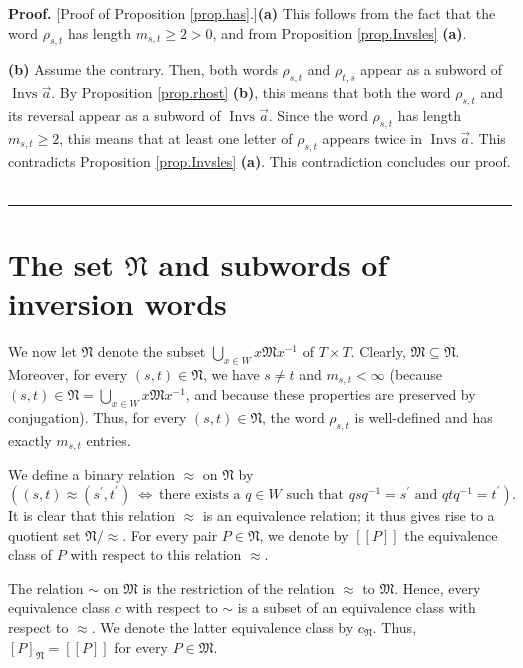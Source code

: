 \documentclass[numbers=enddot,12pt,final,onecolumn,notitlepage,abstracton]{scrartcl}%
\theoremstyle{definition}
\newenvironment{proof}[1][Proof]{\noindent\textbf{#1.} }{\ \rule{0.5em}{0.5em}}
\begin{document}
\begin{proof}
[Proof of Proposition \ref{prop.has}.]\textbf{(a)} This follows from the fact
that the word $\rho_{s,t}$ has length $m_{s,t}\geq2>0$, and from Proposition
\ref{prop.Invsles} \textbf{(a)}. \medskip

\textbf{(b)} Assume the contrary. Then, both words $\rho_{s,t}$ and
$\rho_{t,s}$ appear as a subword of $\operatorname*{Invs}\overrightarrow{a}$.
By Proposition \ref{prop.rhost} \textbf{(b)}, this means that both the word
$\rho_{s,t}$ and its reversal appear as a subword of $\operatorname*{Invs}%
\overrightarrow{a}$. Since the word $\rho_{s,t}$ has length $m_{s,t}\geq2$,
this means that at least one letter of $\rho_{s,t}$ appears twice in
$\operatorname*{Invs}\overrightarrow{a}$. This contradicts Proposition
\ref{prop.Invsles} \textbf{(a)}. This contradiction concludes our proof.
\end{proof}

\section{The set $\mathfrak{N}$ and subwords of inversion words}

We now let $\mathfrak{N}$ denote the subset $\bigcup\limits_{x\in
W}x\mathfrak{M}x^{-1}$ of $T\times T$. Clearly, $\mathfrak{M}\subseteq
\mathfrak{N}$. Moreover, for every $\left(  s,t\right)  \in\mathfrak{N}$, we
have $s\neq t$ and $m_{s,t}<\infty$ (because $\left(  s,t\right)
\in\mathfrak{N}=\bigcup\limits_{x\in W}x\mathfrak{M}x^{-1}$, and because these
properties are preserved by conjugation). Thus, for every $\left(  s,t\right)
\in\mathfrak{N}$, the word $\rho_{s,t}$ is well-defined and has exactly
$m_{s,t}$ entries.

We define a binary relation $\approx$ on $\mathfrak{N}$ by%
\[
\left(  \left(  s,t\right)  \approx\left(  s^{\prime},t^{\prime}\right)
\ \Longleftrightarrow\ \text{there exists a }q\in W\text{ such that }%
qsq^{-1}=s^{\prime}\text{ and }qtq^{-1}=t^{\prime}\right)  .
\]
It is clear that this relation $\approx$ is an equivalence relation; it thus
gives rise to a quotient set $\mathfrak{N}/\approx$. For every pair
$P\in\mathfrak{N}$, we denote by $\left[  \left[  P\right]  \right]  $ the
equivalence class of $P$ with respect to this relation $\approx$.

The relation $\sim$ on $\mathfrak{M}$ is the restriction of the relation
$\approx$ to $\mathfrak{M}$. Hence, every equivalence class $c$ with respect
to $\sim$ is a subset of an equivalence class with respect to $\approx$. We
denote the latter equivalence class by $c_{\mathfrak{N}}$. Thus, $\left[
P\right]  _{\mathfrak{N}}=\left[  \left[  P\right]  \right]  $ for every
$P\in\mathfrak{M}$.
\end{document}
